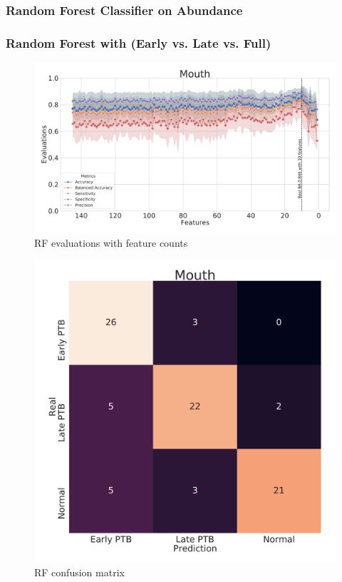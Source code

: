 \documentclass{beamer}
\begin{document}
    \subsubsection{Random Forest Classifier on Abundance}
    \begin{frame}[allowframebreaks]
        \frametitle{Random Forest with (Early vs. Late vs. Full)}

        \begin{figure}
            \includegraphics[width=0.8 \linewidth]{figures/RandomForest/RF.DADA2.homd.uncorrected/Mouth+metrics.pdf}
            \caption{RF evaluations with feature counts}
        \end{figure}

        \begin{figure}
            \includegraphics[width=0.5 \linewidth]{figures/RandomForest/RF.DADA2.homd.uncorrected/Mouth+heatmap.pdf}
            \caption{RF confusion matrix}
        \end{figure}


\end{frame}
\end{document}
